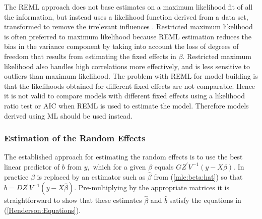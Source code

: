 \documentclass[12pt, a4paper]{report}
\theoremstyle{definition}
\theoremstyle{remark}
\begin{document}
The REML approach does not base estimates on a maximum likelihood fit of all the information, but instead uses a likelihood function derived from a data set, transformed to remove the irrelevant influences \citep{REMLDefine}. Restricted maximum likelihood is often preferred to maximum likelihood because REML estimation reduces the bias in the variance component by taking into account the loss of degrees of freedom that results from estimating the fixed effects in ${\beta}$. Restricted maximum likelihood also handles high correlations more effectively, and is less sensitive to outliers than maximum likelihood.  The problem with REML for model building is that the likelihoods obtained for different fixed effects are not comparable. Hence it is not valid to compare models with different fixed effects using a likelihood ratio test or AIC when REML is used to estimate the model. Therefore models derived using ML should be used instead.

\subsubsection{Estimation of the Random Effects}

The established approach for estimating the random effects is to use the best linear predictor of $b$ from $y,$ which for a given $\beta$ equals $GZ^\prime V^{-1}(y - X \beta).$ In practice $\beta$ is replaced by an estimator such as $\hat{\beta}$ from (\ref{mle:beta:hat}) so that $\hat{b} = DZ^\prime V^{-1}(y - X \hat{\beta}).$ Pre-multiplying by the appropriate matrices it is straightforward to show that these estimates $\hat{\beta}$ and $\hat{b}$ satisfy the equations in (\ref{Henderson:Equations}).
\end{document}
